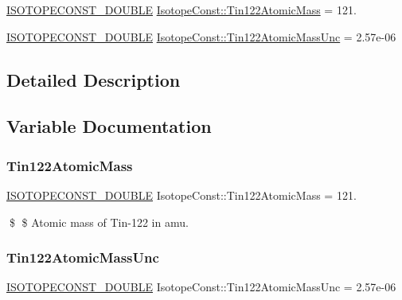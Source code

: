 \begin{DoxyCompactItemize}
\item 
\mbox{\hyperlink{group___isotope_const-_macros_ga8f45a7272ce02c0b4c65c44636ed719a}{I\+S\+O\+T\+O\+P\+E\+C\+O\+N\+S\+T\+\_\+\+D\+O\+U\+B\+LE}} \mbox{\hyperlink{group___isotope_const-_tin-_sn122_gaf80ac0370364f9e9cab3b1fbb3ba32cc}{Isotope\+Const\+::\+Tin122\+Atomic\+Mass}} = 121.
\item 
\mbox{\hyperlink{group___isotope_const-_macros_ga8f45a7272ce02c0b4c65c44636ed719a}{I\+S\+O\+T\+O\+P\+E\+C\+O\+N\+S\+T\+\_\+\+D\+O\+U\+B\+LE}} \mbox{\hyperlink{group___isotope_const-_tin-_sn122_gab4d4054a12cee7676785bf1321cfc319}{Isotope\+Const\+::\+Tin122\+Atomic\+Mass\+Unc}} = 2.\+57e-\/06
\end{DoxyCompactItemize}


\subsection{Detailed Description}


\subsection{Variable Documentation}
\mbox{\label{group___isotope_const-_tin-_sn122_gaf80ac0370364f9e9cab3b1fbb3ba32cc}} 
\subsubsection{\texorpdfstring{Tin122\+Atomic\+Mass}{Tin122AtomicMass}}
{\footnotesize\ttfamily \mbox{\hyperlink{group___isotope_const-_macros_ga8f45a7272ce02c0b4c65c44636ed719a}{I\+S\+O\+T\+O\+P\+E\+C\+O\+N\+S\+T\+\_\+\+D\+O\+U\+B\+LE}} Isotope\+Const\+::\+Tin122\+Atomic\+Mass = 121.}

\$ \$ Atomic mass of Tin-\/122 in amu. \mbox{\label{group___isotope_const-_tin-_sn122_gab4d4054a12cee7676785bf1321cfc319}} 
\subsubsection{\texorpdfstring{Tin122\+Atomic\+Mass\+Unc}{Tin122AtomicMassUnc}}
{\footnotesize\ttfamily \mbox{\hyperlink{group___isotope_const-_macros_ga8f45a7272ce02c0b4c65c44636ed719a}{I\+S\+O\+T\+O\+P\+E\+C\+O\+N\+S\+T\+\_\+\+D\+O\+U\+B\+LE}} Isotope\+Const\+::\+Tin122\+Atomic\+Mass\+Unc = 2.\+57e-\/06}

